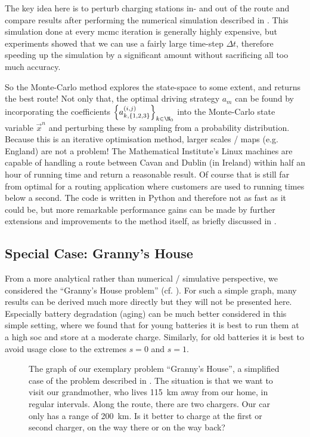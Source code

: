 \documentclass{prettytex/ox/mmsc-special-topic}
\begin{document}
  The key idea here is to perturb charging stations in- and out of the route and compare results after performing the numerical simulation described in .
  This simulation done at every \gls{mcmc} iteration is generally highly expensive, but experiments showed that we can use a fairly large time-step $\Delta t$, therefore speeding up the simulation by a significant amount without sacrificing all too much accuracy.

  So the Monte-Carlo method explores the state-space to some extent, and returns the best route!
  Not only that, the optimal driving strategy $a_m$ can be found by incorporating the coefficients $\left\{a_{k,\{1,2,3\}}^{(i,j)}\right\}_{k\in\N_0}$ into the Monte-Carlo state variable $\vec{x}^{n}$ and perturbing these by sampling from a probability distribution.
  Because this is an iterative optimisation method, larger scales / maps (e.g. England) are not a problem! The Mathematical Institute's Linux machines are capable of handling a route between Cavan and Dublin (in Ireland) within half an hour of running time and return a reasonable result.
  Of course that is still far from optimal for a routing application where customers are used to running times below a second.
  The code is written in Python and therefore not as fast as it could be, but more remarkable performance gains can be made by further extensions and improvements to the method itself, as briefly discussed in .

  \subsection{Special Case: Granny's House}
  From a more analytical rather than numerical / simulative perspective, we considered the ``Granny's House problem'' (cf. ).
  For such a simple graph, many results can be derived much more directly but they will not be presented here.
  Especially battery degradation (aging) can be much better considered in this simple setting, where we found that for young batteries it is best to run them at a high \gls{soc} and store at a moderate charge. Similarly, for old batteries it is best to avoid usage close to the extremes $s = 0$ and $s = 1$.

  \begin{figure}[H]
    \centering
    \caption{The graph of our exemplary problem ``Granny's House'', a simplified case of the problem described in . The situation is that we want to visit our grandmother, who lives \SI{115}{\kilo\meter} away from our home, in regular intervals. Along the route, there are two chargers. Our car only has a range of \SI{200}{\kilo\meter}. Is it better to charge at the first or second charger, on the way there or on the way back?}
    \label{fig:grannys-idealised-problem-setting}
  \end{figure}
\end{document}
